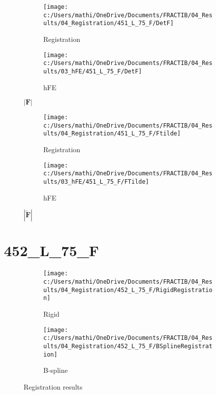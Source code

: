 \documentclass{article}%
\begin{document}
%


\begin{figure}[h!]%
\begin{subfigure}[b]{0.5\linewidth}%
\texttt{[image: c:/Users/mathi/OneDrive/Documents/FRACTIB/04\_Results/04\_Registration/451\_L\_75\_F/DetF]}%
\caption{Registration}%
\end{subfigure}%
\begin{subfigure}[b]{0.5\linewidth}%
\texttt{[image: c:/Users/mathi/OneDrive/Documents/FRACTIB/04\_Results/03\_hFE/451\_L\_75\_F/DetF]}%
\caption{hFE}%
\end{subfigure}%
\caption{$|\mathbf{F}|$}%
\end{figure}

%


\begin{figure}[h!]%
\begin{subfigure}[b]{0.5\linewidth}%
\texttt{[image: c:/Users/mathi/OneDrive/Documents/FRACTIB/04\_Results/04\_Registration/451\_L\_75\_F/Ftilde]}%
\caption{Registration}%
\end{subfigure}%
\begin{subfigure}[b]{0.5\linewidth}%
\texttt{[image: c:/Users/mathi/OneDrive/Documents/FRACTIB/04\_Results/03\_hFE/451\_L\_75\_F/FTilde]}%
\caption{hFE}%
\end{subfigure}%
\caption{$|\widetilde{\mathbf{F}}|$}%
\end{figure}

%
\newpage%
\section*{452\_L\_75\_F}%
\label{sec:452L75F}%


\begin{figure}[h!]%
\begin{subfigure}[b]{0.5\linewidth}%
\texttt{[image: c:/Users/mathi/OneDrive/Documents/FRACTIB/04\_Results/04\_Registration/452\_L\_75\_F/RigidRegistration]}%
\caption{Rigid}%
\end{subfigure}%
\begin{subfigure}[b]{0.5\linewidth}%
\texttt{[image: c:/Users/mathi/OneDrive/Documents/FRACTIB/04\_Results/04\_Registration/452\_L\_75\_F/BSplineRegistration]}%
\caption{B{-}spline}%
\end{subfigure}%
\caption{Registration results}%
\end{figure}

%
\end{document}
